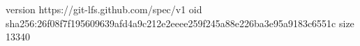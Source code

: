 version https://git-lfs.github.com/spec/v1
oid sha256:26f08f7f195609639afd4a9c212e2eeee259f245a88e226ba3e95a9183c6551c
size 13340
